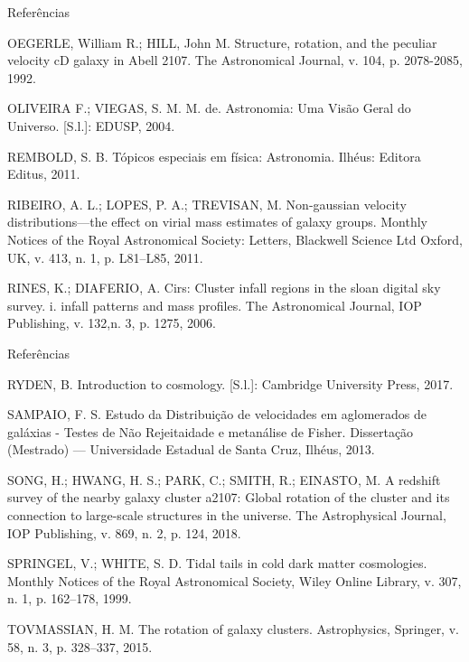 \documentclass[xcolor=dvipsnames,10pt]{beamer}
\begin{document}
\begin{frame}{Referências}
  \begin{thebibliography}{9}
  \fontsize{8}{0}\selectfont
  OEGERLE, William R.; HILL, John M. Structure, rotation, and the peculiar velocity cD galaxy in Abell 2107. The Astronomical Journal, v. 104, p. 2078-2085, 1992.

  OLIVEIRA F.; VIEGAS, S. M. M. de. Astronomia: Uma Visão Geral do Universo. [S.l.]: EDUSP, 2004.

  REMBOLD, S. B. Tópicos especiais em física: Astronomia. Ilhéus: Editora Editus, 2011.

  RIBEIRO, A. L.; LOPES, P. A.; TREVISAN, M. Non-gaussian velocity distributions—the effect on virial mass estimates of galaxy groups. Monthly Notices of the Royal Astronomical Society: Letters, Blackwell Science Ltd Oxford, UK, v. 413, n. 1, p. L81–L85, 2011.

  RINES, K.; DIAFERIO, A. Cirs: Cluster infall regions in the sloan digital sky survey. i. infall patterns and mass profiles. The Astronomical Journal, IOP Publishing, v. 132,n. 3, p. 1275, 2006.
  \end{thebibliography}
\end{frame}

\begin{frame}{Referências}
  \begin{thebibliography}{9}
  \fontsize{8}{0}\selectfont
  RYDEN, B. Introduction to cosmology. [S.l.]: Cambridge University Press, 2017.

  SAMPAIO, F. S. Estudo da Distribuição de velocidades em aglomerados de galáxias - Testes de Não Rejeitaidade e metanálise de Fisher. Dissertação (Mestrado) — Universidade Estadual de Santa Cruz, Ilhéus, 2013.

  SONG, H.; HWANG, H. S.; PARK, C.; SMITH, R.; EINASTO, M. A redshift survey of the nearby galaxy cluster a2107: Global rotation of the cluster and its connection to large-scale structures in the universe. The Astrophysical Journal, IOP Publishing, v. 869, n. 2, p. 124, 2018.

  SPRINGEL, V.; WHITE, S. D. Tidal tails in cold dark matter cosmologies. Monthly Notices of the Royal Astronomical Society, Wiley Online Library, v. 307, n. 1, p. 162–178, 1999.

  TOVMASSIAN, H. M. The rotation of galaxy clusters. Astrophysics, Springer, v. 58, n. 3, p. 328–337, 2015.
  \end{thebibliography}
\end{frame}
\end{document}
